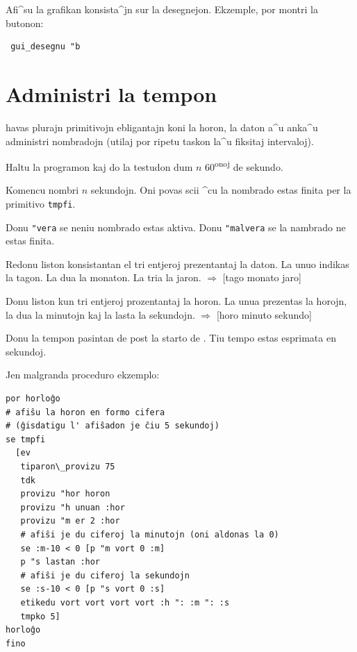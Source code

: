 
Afi^su la grafikan konsista^jn sur la desegnejon.  Ekzemple, por montri la butonon:
\begin{verbatim}
 gui_desegnu "b
\end{verbatim}

\section{Administri la tempon}

\xlogo{} havas plurajn primitivojn ebligantajn koni la horon, la daton
a^u anka^u administri nombradojn (utilaj por ripetu taskon la^u
fiksitaj intervaloj).


Haltu la programon kaj do la testudon dum $n$ 60\textsuperscript{onoj}
de sekundo.


Komencu nombri $n$ sekundojn.  Oni povas scii ^cu la nombrado estas
finita per la primitivo \texttt{tmpfi}.


Donu \texttt{"vera} se neniu nombrado estas aktiva.  Donu
\texttt{"malvera} se la nambrado ne estas finita.


Redonu liston konsistantan el tri entjeroj prezentantaj la daton.  La
unuo indikas la tagon.  La dua la monaton.  La tria la jaron.
$\Longrightarrow$ [tago monato jaro]


Donu liston kun tri entjeroj prozentantaj la horon.  La unua prezentas
la horojn, la dua la minutojn kaj la lasta la
sekundojn. $\Longrightarrow$ [horo minuto sekundo]


Donu la tempon pasintan de post la starto de \xlogo.  Tiu tempo estas
esprimata en sekundoj.

Jen malgranda proceduro ekzemplo:
\begin{verbatim}
por horloĝo
# afiŝu la horon en formo cifera
# (ĝisdatigu l' afiŝadon je ĉiu 5 sekundoj)
se tmpfi 
  [ev 
   tiparon\_provizu 75 
   tdk
   provizu "hor horon
   provizu "h unuan :hor
   provizu "m er 2 :hor
   # afiŝi je du ciferoj la minutojn (oni aldonas la 0)
   se :m-10 < 0 [p "m vort 0 :m]
   p "s lastan :hor
   # afiŝi je du ciferoj la sekundojn
   se :s-10 < 0 [p "s vort 0 :s]
   etikedu vort vort vort vort :h ": :m ": :s 
   tmpko 5]
horloĝo
fino
\end{verbatim} 

